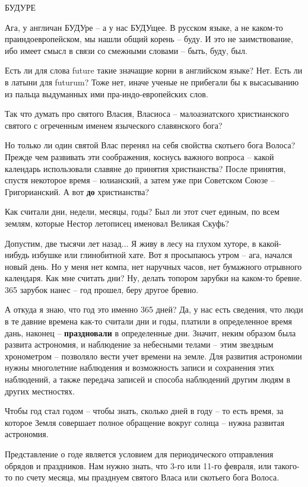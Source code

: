 БУДУРЕ\newline

Ага, у англичан БУДУре – а у нас БУДУщее. В русском языке, а не каком-то праиндоевропейском, мы нашли общий корень – буду. И это не заимствование, ибо имеет смысл в связи со смежными словами – быть, буду, был.

Есть ли для слова future такие значащие корни в английском языке? Нет. Есть ли в латыни для futurum? Тоже нет, иначе ученые не прибегали бы к высасыванию из пальца выдуманных ими пра-индо-европейских слов.

   Так что думать про святого Власия, Власиоса – малоазиатского христианского святого с огреченным именем языческого славянского бога?

    Но только ли один святой Влас перенял на себя свойства скотьего бога Волоса? Прежде чем развивать эти соображения, коснусь важного вопроса – какой календарь использовали славяне до принятия христианства? После принятия, спустя некоторое время – юлианский, а затем уже при Советском Союзе – Григорианский. А вот \textbf{до} христианства? 

   Как считали дни, недели, месяцы, годы? Был ли этот счет единым, по всем землям, которые Нестор летописец именовал Великая Скуфь? 

   Допустим, две тысячи лет назад... Я живу в лесу на глухом хуторе, в какой-нибудь избушке или глинобитной хате. Вот я просыпаюсь утром – ага, начался новый день. Но у меня нет компа, нет наручных часов, нет бумажного отрывного календаря. Как мне считать дни? Ну, делать топором зарубки на каком-то бревне. 365 зарубок нанес – год прошел, беру другое бревно.

   А откуда я знаю, что год это именно 365 дней? Да, у нас есть сведения, что люди в те давние времена как-то считали дни и годы, платили в определенное время дань, наконец – \textbf{праздновали} в определенные дни. Значит, неким образом была развита астрономия, и наблюдение за небесными телами – этим звездным хронометром – позволяло вести учет времени на земле. Для развития астрономии нужны многолетние наблюдения и возможность записи и сохранения этих наблюдений, а также передача записей и способа наблюдений другим людям в других местностях.

   Чтобы год стал годом – чтобы знать, сколько дней в году – то есть время, за которое Земля совершает полное обращение вокруг солнца – нужна развитая астрономия. 

   Представление о годе является условием для периодического отправления обрядов и праздников. Нам нужно знать, что 3-го или 11-го февраля, или такого-то по счету месяца, мы празднуем святого Власа или скотьего бога Волоса.

